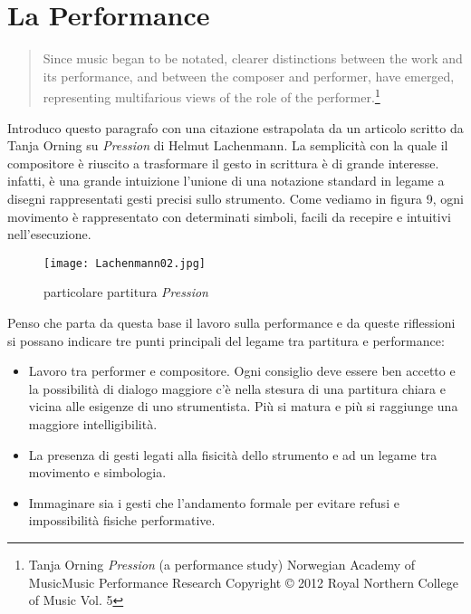 
\chapter{La Performance}
\label{chp:La Performance}
\begin{quotation}
Since music began to be notated, clearer distinctions between the work and its performance, and between the composer and performer, have emerged, representing multifarious views of the role of the performer.\footnote{Tanja Orning \textit{Pression} (a performance study) Norwegian Academy of MusicMusic Performance Research Copyright © 2012 Royal Northern College of Music Vol. 5}
\end{quotation}
Introduco questo paragrafo con una citazione estrapolata da un articolo scritto da Tanja Orning su \textit{Pression} di Helmut Lachenmann. La semplicità con la quale il compositore è riuscito a trasformare il gesto in scrittura è di grande interesse. infatti, è una grande intuizione l'unione di una notazione standard in legame a disegni rappresentati gesti precisi sullo strumento. Come vediamo in figura 9, ogni movimento è rappresentato con determinati simboli, facili da recepire e intuitivi nell'esecuzione. 
\begin{figure}[!h]
\centering
\texttt{[image: Lachenmann02.jpg]}
\caption{particolare partitura \textit{Pression}}
\end{figure}
Penso che parta da questa base il lavoro sulla performance e da queste riflessioni si possano indicare tre punti principali del legame tra partitura e performance:
\begin{itemize}

\item{Lavoro tra performer e compositore. Ogni consiglio deve essere ben accetto e la possibilità di dialogo maggiore c'è nella stesura di una partitura chiara e vicina alle esigenze di uno strumentista. Più si matura e più si 
raggiunge una maggiore intelligibilità.}

\item{La presenza di gesti legati alla fisicità dello strumento e ad un legame tra movimento e simbologia.}

\item{Immaginare sia i gesti che l'andamento formale per evitare refusi e impossibilità fisiche performative.}

\end{itemize}

